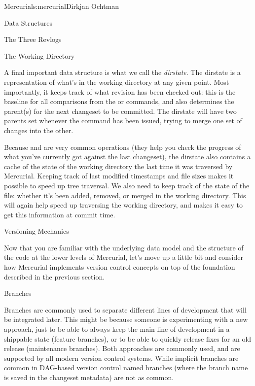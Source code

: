 \begin{aosachapter}{Mercurial}{s:mercurial}{Dirkjan Ochtman}
\begin{aosasect1}{Data Structures}
\begin{aosasect2}{The Three Revlogs}
\end{aosasect2}

\begin{aosasect2}{The Working Directory}

A final important data structure is what we call the
\emph{dirstate}. The dirstate is a representation of what's in the
working directory at any given point. Most importantly, it keeps track
of what revision has been checked out: this is the baseline for all
comparisons from the  or  commands, and also
determines the parent(s) for the next changeset to be committed. The
dirstate will have two parents set whenever the  command
has been issued, trying to merge one set of changes into the other.

Because  and  are very common operations (they
help you check the progress of what you've currently got against the
last changeset), the dirstate also contains a cache of the state of
the working directory the last time it was traversed by Mercurial.
Keeping track of last modified timestamps and file sizes makes it
possible to speed up tree traversal. We also need to keep track of the
state of the file: whether it's been added, removed, or merged in the
working directory. This will again help speed up traversing the
working directory, and makes it easy to get this information at commit
time.

\end{aosasect2}

\end{aosasect1}

\begin{aosasect1}{Versioning Mechanics}

Now that you are familiar with the underlying data model and the
structure of the code at the lower levels of Mercurial, let's move up
a little bit and consider how Mercurial implements version control
concepts on top of the foundation described in the previous section.

\begin{aosasect2}{Branches}

Branches are commonly used to separate different lines of development
that will be integrated later. This might be because someone is
experimenting with a new approach, just to be able to always keep the
main line of development in a shippable state (feature branches), or
to be able to quickly release fixes for an old release (maintenance
branches). Both approaches are commonly used, and are supported by all
modern version control systems. While implicit branches are common in
DAG-based version control named branches (where the branch name is
saved in the changeset metadata) are not as common.


\end{aosasect2}
\end{aosasect1}
\end{aosachapter}
